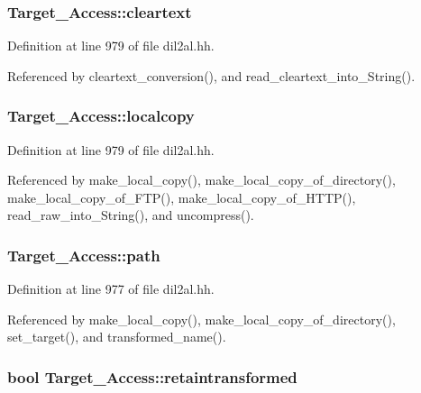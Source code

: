 \subsubsection{ Target\_\-Access::cleartext\hspace{0.3cm}{\tt  [protected]}}\label{classTarget__Access_n7}




Definition at line 979 of file dil2al.hh.

Referenced by cleartext\_\-conversion(), and read\_\-cleartext\_\-into\_\-String().
\subsubsection{ Target\_\-Access::localcopy\hspace{0.3cm}{\tt  [protected]}}\label{classTarget__Access_n5}




Definition at line 979 of file dil2al.hh.

Referenced by make\_\-local\_\-copy(), make\_\-local\_\-copy\_\-of\_\-directory(), make\_\-local\_\-copy\_\-of\_\-FTP(), make\_\-local\_\-copy\_\-of\_\-HTTP(), read\_\-raw\_\-into\_\-String(), and uncompress().
\subsubsection{ Target\_\-Access::path\hspace{0.3cm}{\tt  [protected]}}\label{classTarget__Access_n3}




Definition at line 977 of file dil2al.hh.

Referenced by make\_\-local\_\-copy(), make\_\-local\_\-copy\_\-of\_\-directory(), set\_\-target(), and transformed\_\-name().
\subsubsection{\setlength{\rightskip}{0pt plus 5cm}bool Target\_\-Access::retaintransformed\hspace{0.3cm}{\tt  [protected]}}\label{classTarget__Access_n8}




